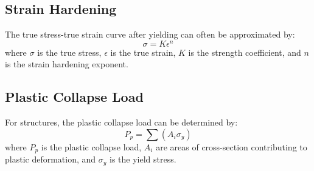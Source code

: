 \documentclass[12pt]{article}
\begin{document}
\subsection{Strain Hardening}
The true stress-true strain curve after yielding can often be approximated by:
\begin{equation}
\sigma = K \epsilon^n
\end{equation}
where $\sigma$ is the true stress, $\epsilon$ is the true strain, $K$ is the strength coefficient, and $n$ is the strain hardening exponent.

\subsection{Plastic Collapse Load}
For structures, the plastic collapse load can be determined by:
\begin{equation}
P_p = \sum (A_i \sigma_y)
\end{equation}
where $P_p$ is the plastic collapse load, $A_i$ are areas of cross-section contributing to plastic deformation, and $\sigma_y$ is the yield stress.
\end{document}
